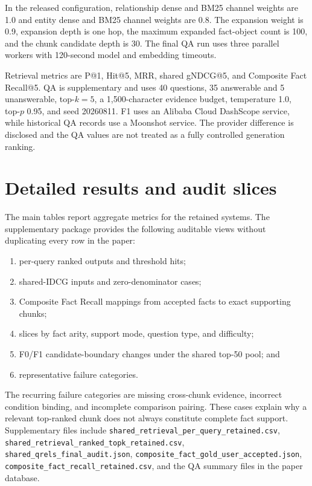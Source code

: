 In the released configuration, relationship dense and BM25 channel weights are 1.0 and entity dense and BM25 channel weights are 0.8. The expansion weight is 0.9, expansion depth is one hop, the maximum expanded fact-object count is 100, and the chunk candidate depth is 30. The final QA run uses three parallel workers with 120-second model and embedding timeouts.

Retrieval metrics are P@1, Hit@5, MRR, shared gNDCG@5, and Composite Fact Recall@5. QA is supplementary and uses 40 questions, 35 answerable and 5 unanswerable, top-$k=5$, a 1,500-character evidence budget, temperature 1.0, top-$p$ 0.95, and seed 20260811. F1 uses an Alibaba Cloud DashScope service, while historical QA records use a Moonshot service. The provider difference is disclosed and the QA values are not treated as a fully controlled generation ranking.

\section{Detailed results and audit slices}

The main tables report aggregate metrics for the retained systems. The supplementary package provides the following auditable views without duplicating every row in the paper:

\begin{enumerate}
\item per-query ranked outputs and threshold hits;
\item shared-IDCG inputs and zero-denominator cases;
\item Composite Fact Recall mappings from accepted facts to exact supporting chunks;
\item slices by fact arity, support mode, question type, and difficulty;
\item F0/F1 candidate-boundary changes under the shared top-50 pool; and
\item representative failure categories.
\end{enumerate}

The recurring failure categories are missing cross-chunk evidence, incorrect condition binding, and incomplete comparison pairing. These cases explain why a relevant top-ranked chunk does not always constitute complete fact support. Supplementary files include \texttt{shared\_retrieval\_per\_query\_retained.csv}, \texttt{shared\_retrieval\_ranked\_topk\_retained.csv}, \texttt{shared\_qrels\_final\_audit.json}, \texttt{composite\_fact\_gold\_user\_accepted.json}, \texttt{composite\_fact\_recall\_retained.csv}, and the QA summary files in the paper database.

